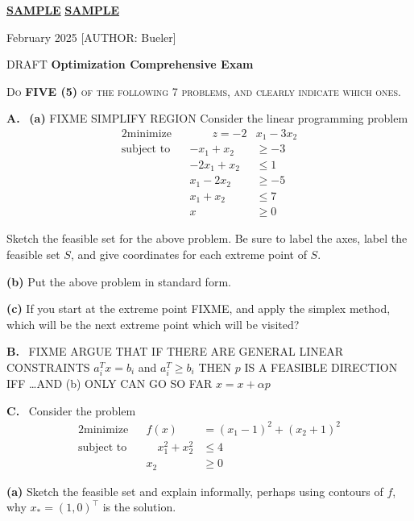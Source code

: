 \documentclass[11pt]{amsart}
\newcommand{\prob}[1]{\bigskip\noindent\large\textbf{#1.} \, \normalsize}
\newcommand{\apart}[1]{\textbf{(#1)} \quad}
\newcommand{\epart}[1]{\medskip\noindent \textbf{(#1)} \quad}
\begin{document}
\thispagestyle{empty}
\Large \noindent \underline{\textbf{SAMPLE}} \hfill\underline{\textbf{SAMPLE}}

\scriptsize \noindent February 2025  \hfill  \tiny [AUTHOR: Bueler]
\normalsize\bigskip

\centerline{\large DRAFT \textbf{Optimization Comprehensive Exam}}
\bigskip

\centerline{\textsc{Do \textbf{FIVE (5)} of the following 7 problems, and clearly indicate which ones.}}
\smallskip

\thispagestyle{empty}

\prob{A}  \apart{a} FIXME SIMPLIFY REGION Consider the linear programming problem
\begin{alignat*}{2}
    \text{minimize}   && \qquad z = - 2 &x_1 - 3 x_2 \\
    \text{subject to} && -x_1 + x_2 &\ge -3 \\
                      && - 2 x_1 + x_2 &\le 1 \\
                      && x_1 - 2 x_2 &\ge -5 \\
                      && x_1 + x_2 & \le 7 \\
                      && x &\ge 0
\end{alignat*}

Sketch the feasible set for the above problem.  Be sure to label the axes, label the feasible set $S$, and give coordinates for each extreme point of $S$.

\epart{b} Put the above problem in standard form.

\epart{c} If you start at the extreme point FIXME, and apply the simplex method, which will be the next extreme point which will be visited?


\prob{B}  FIXME ARGUE THAT IF THERE ARE GENERAL LINEAR CONSTRAINTS $a_i^T x = b_i$ and $a_i^T \ge b_i$ THEN $p$ IS A FEASIBLE DIRECTION IFF \dots AND (b) ONLY CAN GO SO FAR $x = x + \alpha p$


\prob{C}  Consider the problem
\begin{alignat*}{2}
    \text{minimize}   &&  f(x) &= (x_1-1)^2 + (x_2+1)^2 \\
    \text{subject to} && \quad x_1^2 + x_2^2 &\le 4 \\
                      &&        x_2 &\ge 0
\end{alignat*}

\epart{a}  Sketch the feasible set and explain informally, perhaps using contours of $f$, why $x_*=(1,0)^\top$ is the solution.
\end{document}
